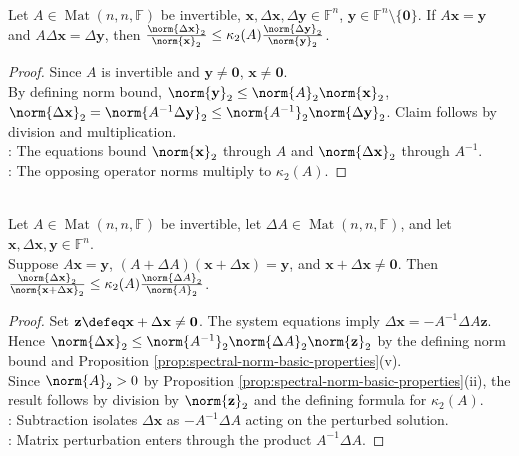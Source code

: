 \begin{theorem} \label{thm:linear-system-relative-error-condition-number} \\
Let $A\in\operatorname{Mat}(n,n,\mathbb{F})$ be invertible, $\mathbf{x},\Delta\mathbf{x},\Delta\mathbf{y}\in\mathbb{F}^n$, $\mathbf{y}\in\mathbb{F}^n\setminus\{\mathbf{0}\}$. If $A\mathbf{x}=\mathbf{y}$ and $A\Delta\mathbf{x}=\Delta\mathbf{y}$, then $\frac{\norm{\Delta\mathbf{x}}_2}{\norm{\mathbf{x}}_2}\leq\kappa_2(A)\frac{\norm{\Delta\mathbf{y}}_2}{\norm{\mathbf{y}}_2}$.
\begin{proof}
Since $A$ is invertible and $\mathbf{y}\neq\mathbf{0}$, $\mathbf{x}\neq\mathbf{0}$.\\
By defining norm bound, $\norm{\mathbf{y}}_2\leq\norm{A}_2\norm{\mathbf{x}}_2$, $\norm{\Delta\mathbf{x}}_2=\norm{A^{-1}\Delta\mathbf{y}}_2\leq\norm{A^{-1}}_2\norm{\Delta\mathbf{y}}_2$. Claim follows by division and multiplication.\\
: The equations bound $\norm{\mathbf{x}}_2$ through $A$ and $\norm{\Delta\mathbf{x}}_2$ through $A^{-1}$.\\
: The opposing operator norms multiply to $\kappa_2(A)$.
\end{proof}
\end{theorem}

\begin{theorem} \label{thm:matrix-perturbation-relative-error-condition-number} \\
Let $A\in\operatorname{Mat}(n,n,\mathbb{F})$ be invertible, let $\Delta A\in\operatorname{Mat}(n,n,\mathbb{F})$, and let $\mathbf{x},\Delta\mathbf{x},\mathbf{y}\in\mathbb{F}^n$.\\
Suppose $A\mathbf{x}=\mathbf{y}$, $(A+\Delta A)(\mathbf{x}+\Delta\mathbf{x})=\mathbf{y}$, and $\mathbf{x}+\Delta\mathbf{x}\neq\mathbf{0}$. Then $\frac{\norm{\Delta\mathbf{x}}_2}{\norm{\mathbf{x}+\Delta\mathbf{x}}_2}\leq\kappa_2(A)\frac{\norm{\Delta A}_2}{\norm{A}_2}$.
\begin{proof}
Set $\mathbf{z}\defeq\mathbf{x}+\Delta\mathbf{x}\neq\mathbf{0}$. The system equations imply $\Delta\mathbf{x}=-A^{-1}\Delta A\mathbf{z}$.\\
Hence $\norm{\Delta\mathbf{x}}_2\leq\norm{A^{-1}}_2\norm{\Delta A}_2\norm{\mathbf{z}}_2$ by the defining norm bound and Proposition \ref{prop:spectral-norm-basic-properties}(v).\\
Since $\norm{A}_2>0$ by Proposition \ref{prop:spectral-norm-basic-properties}(ii), the result follows by division by $\norm{\mathbf{z}}_2$ and the defining formula for $\kappa_2(A)$.\\
: Subtraction isolates $\Delta\mathbf{x}$ as $-A^{-1}\Delta A$ acting on the perturbed solution.\\
: Matrix perturbation enters through the product $A^{-1}\Delta A$.
\end{proof}
\end{theorem}

